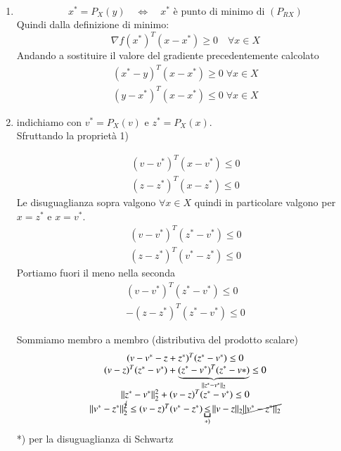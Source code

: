 \begin{thproof}
  \begin{enumerate}
  \item $$ x^{*} = P_{X}(y) \quad \Longleftrightarrow \quad
    x^{*} \text{ \`e punto di minimo di } (P_{RX}) $$
    Quindi dalla definizione di minimo:
    $$ \nabla f(x^{*})^{T} (x - x^{*}) \geq 0 \quad \forall x \in X $$
    Andando a sostituire il valore del gradiente precedentemente calcolato
    \[\begin{array}{l}
      (x^{*} - y)^{T} (x - x^{*}) \geq 0 \; \forall x \in X \\
      (y - x^{*})^{T} (x - x^{*}) \leq 0 \; \forall x \in X
    \end{array}\]

  \item indichiamo con $v^{*} = P_{X}(v)$ e $z^{*} = P_{X}(x)$.\\
    Sfruttando la propriet\`a 1)
    
    \[\begin{array}{l}
      (v - v^{*})^{T} (x - v^{*}) \leq 0 \\
      (z - z^{*})^{T} (x - z^{*}) \leq 0 
    \end{array}\]
    Le disuguaglianza sopra valgono $\forall x \in X$ quindi in
    particolare valgono per $x=z^*$ e $x=v^*$.
    \[\begin{array}{l}
      (v - v^{*})^{T} (z^{*} - v^{*}) \leq 0 \\
      (z - z^{*})^{T} (v^{*} - z^{*}) \leq 0 
    \end{array}\]
    Portiamo fuori il meno nella seconda
    \[\begin{array}{l}
      (v - v^{*})^{T} (z^{*} - v^{*}) \leq 0 \\
      - (z - z^{*})^{T} (z^{*} - v^{*}) \leq 0 
    \end{array}\]

    Sommiamo membro a membro (distributiva del prodotto scalare)
    $$
    \begin{array}{c}
      (v - v^{*} - z + z^{*})^{T}(z^{*} - v^{*}) \leq 0 \\
      (v - z)^{T}(z^* - v^*) + \underbrace{(z^* - v^*)^{T}(z^* -
        v*)}_{||z^* - v^*||_2} \leq 0 \\
      || z^{*} - v^{*}||_{2}^{2} + (v - z)^{T}(z^{*} - v^{*}) \leq 0 \\
      || v^{*} - z^{*}||_{2}^{\cancel{2}} \leq
      (v - z)^{T} (v^{*} - z^{*}) \underbracket{\leq}_{*)}
      ||v - z ||_{2} \cancel{||v^{*} -z^{*}||_{2}}
    \end{array}
    $$
    *) per la disuguaglianza di Schwartz
  \end{enumerate}
\end{thproof}

